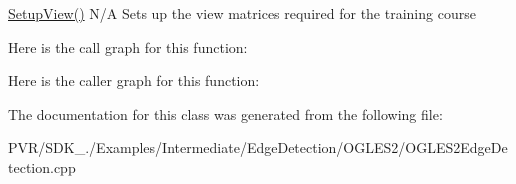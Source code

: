   \hyperlink{class_o_g_l_e_s2_edge_detection_a98694ab38268b5d699f02e53cbec229f}{Setup\+View()}  N/\+A  Sets up the view matrices required for the training course 

Here is the call graph for this function\+:




Here is the caller graph for this function\+:




The documentation for this class was generated from the following file\+:\begin{DoxyCompactItemize}
\item 
P\+V\+R/\+S\+D\+K\+\_./\+Examples/\+Intermediate/\+Edge\+Detection/\+O\+G\+L\+E\+S2/O\+G\+L\+E\+S2\+Edge\+Detection.\+cpp\end{DoxyCompactItemize}
